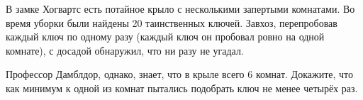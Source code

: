\question
В замке Хогвартс есть потайное крыло с несколькими запертыми комнатами. Во время уборки были найдены 20 таинственных ключей. Завхоз, перепробовав каждый ключ по одному разу (каждый ключ он пробовал ровно на одной комнате), с досадой обнаружил, что ни разу не угадал.

Профессор Дамблдор, однако, знает, что в крыле всего 6 комнат. Докажите, что как минимум к одной из комнат пытались подобрать ключ не менее четырёх раз.
